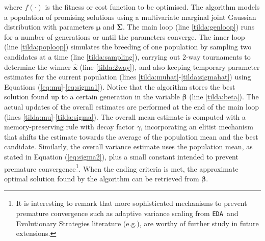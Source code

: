 \documentclass{sig-alternate}
\newcommand{\bx}{{\mathbf x}}
\newcommand{\bmu}{{\boldsymbol \mu}}
\newcommand{\bsigma}{{\boldsymbol \Sigma}}
\newcommand{\bbeta}{{\boldsymbol \beta}}
\newcommand{\EDA}{\texttt{EDA}}
\begin{document}
where $f(\cdot)$ is the fitness or cost function to be optimised. The algorithm models a population of promising solutions using a multivariate marginal joint Gaussian distribution with parameters $\bmu$ and $\bsigma$. The main loop (line \ref{tilda:genloop}) runs for a number of generations or until the parameters converge. The inner loop (line \ref{tilda:poploop}) simulates the breeding of one population by sampling two candidates at a time (line \ref{tilda:sampling}), carrying out 2-way tournaments to determine the winner $\hat{\bx}$ (line \ref{tilda:2way}), and also keeping temporary parameter estimates for the current population (lines \ref{tilda:muhat}-\ref{tilda:sigmahat}) using Equations (\ref{eq:mu}-\ref{eq:sigma1}). Notice that the algorithm stores the best solution found up to a certain generation in the variable $\bbeta$ (line \ref{tilda:beta}). The actual updates of the overall estimates are performed at the end of the main loop (lines \ref{tilda:mu}-\ref{tilda:sigma}). The overall mean estimate is computed with a memory-preserving rule with decay factor $\gamma$, incorporating an elitist mechanism that shifts the estimate towards the average of the population mean and the best candidate. Similarly, the overall variance estimate uses the population mean, as stated in Equation (\ref{eq:sigma2}), plus a small constant intended to prevent premature convergence\footnote{It is interesting to remark that more sophisticated mechanisms to prevent premature convergence such as adaptive variance scaling from \EDA~and Evolutionary Strategies literature (e.g.\cite{Kramer11, Cai07, Back93}), are worthy of further study in future extensions.}. When the ending criteria is met, the approximate optimal solution found by the algorithm can be retrieved from $\bbeta$.
\end{document}
